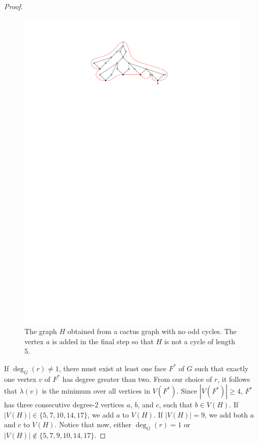 \documentclass{patmorin}
\begin{document}
\begin{proof}
 \begin{figure}
    \begin{center}
        \includegraphics{figs/cactus}
    \end{center}
    \caption{The graph $H$ obtained from a cactus graph with no odd cycles.
        The vertex $a$ is added in the final step so that $H$ is not a cycle
        of length 5.}
 \end{figure}

If $\deg_G(r)\not=1$, there must exist at least one face $F^*$ of $G$ such
that exactly one vertex $v$ of $F^*$ has degree greater than two. From
our choice of $r$, it follows that $\lambda(v)$ is the minimum over all
vertices in $V(F^*)$.  Since $|V(F^*)|\ge 4$, $F^*$ has three consecutive
degree-2 vertices $a$, $b$, and $c$, such that $b\in V(H)$. If $|V(H)|\in
\{5,7,10,14,17\}$, we add $a$ to $V(H)$. If $|V(H)|=9$, we add both $a$
and $c$ to $V(H)$. Notice that now, either $\deg_G(r)=1$ or $|V(H)|\notin
\{5,7,9,10,14,17\}$.


\end{proof}
\end{document}
